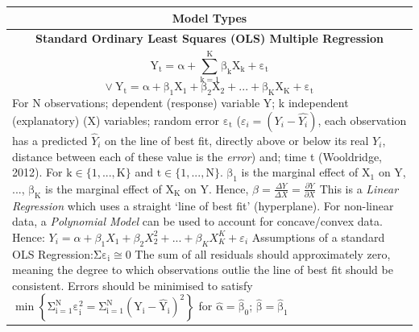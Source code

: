 \documentclass[11pt, english]{article}
\begin{document}
	\begin{center}
                \scriptsize
        \begin{longtable}{p{14cm}}
                \hline
                \hline
                \multicolumn{1}{c}{\textbf{Model Types}}\\
                \hline
                \hline
                \multicolumn{1}{c}{\textbf{Standard Ordinary Least Squares (OLS) Multiple Regression}}\\
                \hline
                $$\mathrm{Y_t=\alpha+\sum_{k=1}^K\beta_kX_k+\varepsilon_t}$$
                $$\mathrm{\lor\ Y_t=\alpha+\beta_1X_1+\beta_2X_2+...+\beta_KX_K+\varepsilon_t}$$
		For N observations; dependent (response) variable Y; k independent (explanatory) (X) variables; random error $\mathrm{\varepsilon_t}$ ($\varepsilon_i=(Y_i-\hat{Y_i})$, each observation has a predicted $\hat{Y}_i$ on the line of best fit, directly above or below its real $Y_i$, distance between each of these value is the \textit{error}) and; time t (Wooldridge, 2012). For $\mathrm{k\in\{1,...,K\}}$ and $\mathrm{t\in\{1,...,N\}}$.\newline\newline 
                $\mathrm{\beta_1}$ is the marginal effect of X$_1$ on Y, ..., $\mathrm{\beta_K}$ is the marginal effect of X$\mathrm{_K}$ on Y. Hence, $\beta=\frac{\Delta Y}{\Delta X}=\frac{\partial Y}{\partial X}$\newline\newline
		This is a \textit{Linear Regression} which uses a straight `line of best fit' (hyperplane). For non-linear data, a \textit{Polynomial Model} can be used to account for concave/convex data. Hence: $Y_i=\alpha+\beta_1X_1+\beta_2X_2^2+...+\beta_KX_K^K+\varepsilon_i$\newline\newline
                Assumptions of a standard OLS Regression:\newline\newline
                [1] $\mathrm{\Sigma\varepsilon_i\cong0}$\newline\newline
                The sum of all residuals should approximately zero, meaning the degree to which observations outlie the line of best fit should be consistent. Errors should be minimised to satisfy $\mathrm{\min\left\{\Sigma_{i=1}^N\varepsilon_i^2=\Sigma_{i=1}^N\left(Y_i-\hat{Y}_i\right)^2\right\}}$ for $\mathrm{\hat{\alpha}=\hat{\beta}_0}$; $\mathrm{\hat{\beta}=\hat{\beta}_1}$\newline\newline

\end{longtable}
\end{center}
\end{document}
